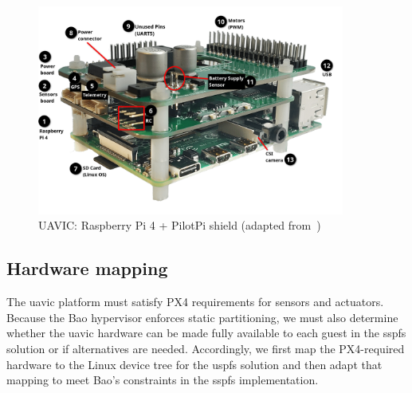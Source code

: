\begin{figure}[!hbt]
  \centering
  \includegraphics[width=0.9\textwidth]{./img/png/pilotpi-annotated}
  \caption[UAVIC: Raspberry Pi 4 + PilotPi shield]{UAVIC: Raspberry Pi 4 +
    PilotPi shield (adapted from~\cite{px4-pilotpi})\footnotemark}
  \label{fig:pilotpi-annot}
\end{figure}
%

\subsection{Hardware mapping}
\label{sec:hardware-mapping}
The \gls{uavic} platform must satisfy PX4 requirements for sensors and
actuators. Because the Bao hypervisor enforces static partitioning, we must also
determine whether the \gls{uavic} hardware can be made fully available to each
guest in the \gls{sspfs} solution or if alternatives are needed.
Accordingly, we first map the PX4-required hardware to the Linux device tree for
the \gls{uspfs} solution and then adapt that mapping to meet Bao’s constraints in the \gls{sspfs} implementation.

